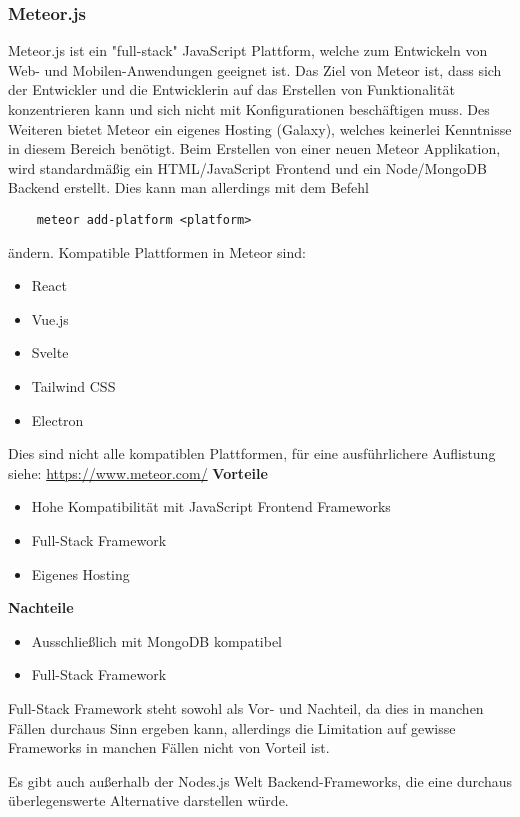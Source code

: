 \subsubsection{Meteor.js}
Meteor.js ist ein "full-stack" JavaScript Plattform, welche zum Entwickeln von Web- und Mobilen-Anwendungen geeignet ist. Das Ziel von Meteor ist, dass sich der Entwickler und die Entwicklerin auf das Erstellen von Funktionalität konzentrieren kann und sich nicht mit Konfigurationen beschäftigen muss. Des Weiteren bietet Meteor ein eigenes Hosting (Galaxy), welches keinerlei Kenntnisse in diesem Bereich benötigt. 
\newline
Beim Erstellen von einer neuen Meteor Applikation, wird standardmäßig ein HTML/JavaScript Frontend und ein Node/MongoDB Backend erstellt. Dies kann man allerdings mit dem Befehl
\begin{verbatim}
    meteor add-platform <platform>
\end{verbatim}
ändern. Kompatible Plattformen in Meteor sind:
\begin{itemize}
    \item React
    \item Vue.js
    \item Svelte
    \item Tailwind CSS
    \item Electron
\end{itemize}
Dies sind nicht alle kompatiblen Plattformen, für eine ausführlichere Auflistung siehe: \url{https://www.meteor.com/}
\newpage
\textbf{Vorteile}
\begin{itemize}
    \item Hohe Kompatibilität mit JavaScript Frontend Frameworks
    \item Full-Stack Framework
    \item Eigenes Hosting
\end{itemize}
\textbf{Nachteile}
\begin{itemize}
    \item Ausschließlich mit MongoDB kompatibel
    \item Full-Stack Framework
\end{itemize}
Full-Stack Framework steht sowohl als Vor- und Nachteil, da dies in manchen Fällen durchaus Sinn ergeben kann, allerdings die Limitation auf gewisse Frameworks in manchen Fällen nicht von Vorteil ist.
\cite{backend_meteor}
\cite{backend_meteor_1}

Es gibt auch außerhalb der Nodes.js Welt Backend-Frameworks, die eine durchaus überlegenswerte Alternative darstellen würde.

